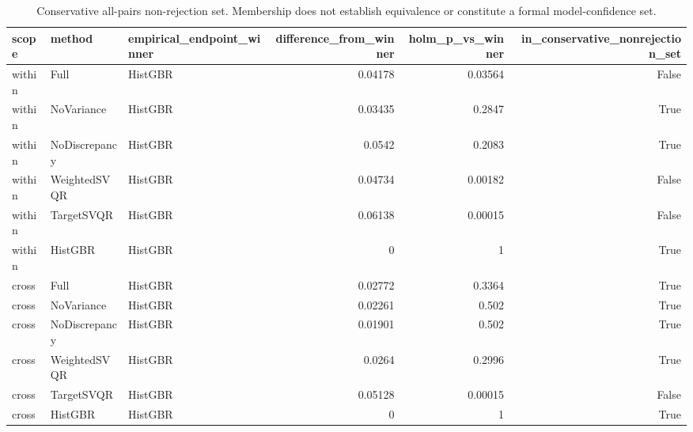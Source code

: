 \begin{table}
\caption{Conservative all-pairs non-rejection set. Membership does not establish equivalence or constitute a formal model-confidence set.}
\label{tab:selection-v2-first-tier}
\begin{tabular}{lllrrr}
\toprule
scope & method & empirical\_endpoint\_winner & difference\_from\_winner & holm\_p\_vs\_winner & in\_conservative\_nonrejection\_set \\
\midrule
within & Full & HistGBR & 0.04178 & 0.03564 & False \\
within & NoVariance & HistGBR & 0.03435 & 0.2847 & True \\
within & NoDiscrepancy & HistGBR & 0.0542 & 0.2083 & True \\
within & WeightedSVQR & HistGBR & 0.04734 & 0.00182 & False \\
within & TargetSVQR & HistGBR & 0.06138 & 0.00015 & False \\
within & HistGBR & HistGBR & 0 & 1 & True \\
cross & Full & HistGBR & 0.02772 & 0.3364 & True \\
cross & NoVariance & HistGBR & 0.02261 & 0.502 & True \\
cross & NoDiscrepancy & HistGBR & 0.01901 & 0.502 & True \\
cross & WeightedSVQR & HistGBR & 0.0264 & 0.2996 & True \\
cross & TargetSVQR & HistGBR & 0.05128 & 0.00015 & False \\
cross & HistGBR & HistGBR & 0 & 1 & True \\
\bottomrule
\end{tabular}
\end{table}
